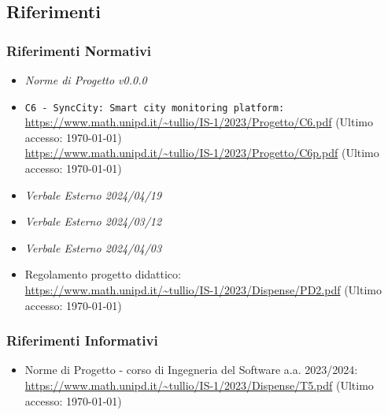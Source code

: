 \subsection{Riferimenti}
\subsubsection{Riferimenti Normativi}
\begin{itemize}
	\setlength\itemsep{0em}
	\item \textit{Norme di Progetto v0.0.0}
	\item {} \texttt{C6 - SyncCity: Smart city monitoring platform:} \\ \url{https://www.math.unipd.it/~tullio/IS-1/2023/Progetto/C6.pdf} (Ultimo accesso: \today) \\ \url{https://www.math.unipd.it/~tullio/IS-1/2023/Progetto/C6p.pdf} (Ultimo accesso: \today)
	\item \textit{Verbale Esterno 2024/04/19}
    \item \textit{Verbale Esterno 2024/03/12}
	\item \textit{Verbale Esterno 2024/04/03}
	\item Regolamento progetto didattico: \\ \url{https://www.math.unipd.it/~tullio/IS-1/2023/Dispense/PD2.pdf} (Ultimo accesso: \today)
\end{itemize}
\subsubsection{Riferimenti Informativi}
\begin{itemize}
	\setlength\itemsep{0em}
	\item Norme di Progetto - corso di Ingegneria del Software a.a. 2023/2024: \\ \url{https://www.math.unipd.it/~tullio/IS-1/2023/Dispense/T5.pdf} (Ultimo accesso: \today)
\end{itemize}
\newpage
